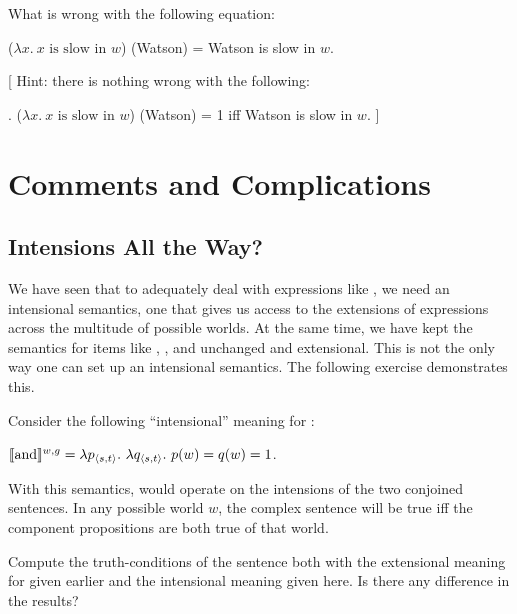 \begin{exercise}\label{exercise:meta}%
%
  What is wrong with the following equation:

	\ex ($\lambda x.\ x \mbox{ is slow in } w$) (Watson) = Watson is slow
	in $w$. \xe

	[ Hint: there is nothing wrong with the following:

	\ex. ($\lambda x.\ x \mbox{ is slow in } w$) (Watson) = 1 iff Watson is slow
	in $w$. ] \xe \eex
	
\end{exercise}



\section{Comments and Complications} \label{sec:comm-compl}

\subsection{Intensions All the Way?} \label{sec:intensions-all-way}

We have seen that to adequately deal with expressions like , we need an intensional semantics, one that gives us
access to the extensions of expressions across the multitude of possible worlds.
At the same time, we have kept the semantics for items like ,
, and  unchanged and extensional. This is not
the only way one can set up an intensional semantics. The following exercise
demonstrates this.
\begin{exercise}
	
  Consider the following ``intensional'' meaning for :
	
  \ex
  $\llbracket \mbox{and} \rrbracket^{w,g} = \lambda p_{\langle s,t \rangle}.\ \lambda
  q_{\langle s,t \rangle}.\ p(w) = q(w) = 1$.
  \xe
	
  With this semantics,  would operate on the intensions of the
  two conjoined sentences. In any possible world $w$, the complex sentence will
  be true iff the component propositions are both true of that world.
	
  Compute the truth-conditions of the sentence  both with the
  extensional meaning for  given earlier and the intensional
  meaning given here. Is there any difference in the results? \eex
\end{exercise}

